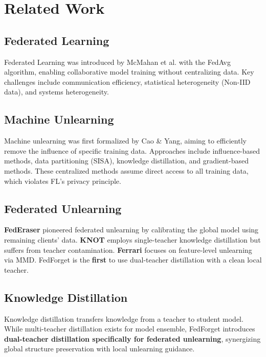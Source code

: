 \documentclass[10pt,twocolumn]{article}
\begin{document}
\section{Related Work}

\subsection{Federated Learning}

Federated Learning was introduced by McMahan et al. with the FedAvg algorithm, enabling collaborative model training without centralizing data. Key challenges include communication efficiency, statistical heterogeneity (Non-IID data), and systems heterogeneity.

\subsection{Machine Unlearning}

Machine unlearning was first formalized by Cao \& Yang, aiming to efficiently remove the influence of specific training data. Approaches include influence-based methods, data partitioning (SISA), knowledge distillation, and gradient-based methods. These centralized methods assume direct access to all training data, which violates FL's privacy principle.

\subsection{Federated Unlearning}

\textbf{FedEraser} pioneered federated unlearning by calibrating the global model using remaining clients' data. \textbf{KNOT} employs single-teacher knowledge distillation but suffers from teacher contamination. \textbf{Ferrari} focuses on feature-level unlearning via MMD. FedForget is the \textbf{first} to use dual-teacher distillation with a clean local teacher.

\subsection{Knowledge Distillation}

Knowledge distillation transfers knowledge from a teacher to student model. While multi-teacher distillation exists for model ensemble, FedForget introduces \textbf{dual-teacher distillation specifically for federated unlearning}, synergizing global structure preservation with local unlearning guidance.
\end{document}

